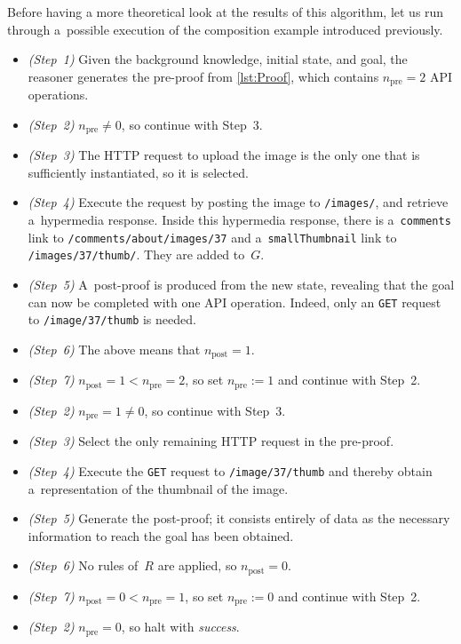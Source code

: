 Before having a more theoretical look at the results of this algorithm,
let us run through a~possible execution
of the composition example introduced previously.

\newcommand\stepref[1]{\emph{(Step~#1)}}
\begin{itemize}
  \item \stepref{1} Given the background knowledge, initial state, and goal,
        the reasoner generates the pre-proof from \cref{lst:Proof},
        which contains $n_{\text{pre}} = 2$ API operations.
  \item \stepref{2} $n_{\text{pre}} \neq 0$, so continue with Step~3.
  \item \stepref{3} The HTTP request to upload the image
        is the only one that is sufficiently instantiated,
        so it is selected.
  \item \stepref{4} Execute the \http request
        by posting the image to \verb!/images/!,
        and retrieve a~hypermedia response.
        Inside this hypermedia response,
        there is a~\verb!comments! link to \verb!/comments/about/images/37!
        and a~\verb!smallThumbnail! link to \verb!/images/37/thumb/!.
        They are added to~$G$.
  \item \stepref{5} A~post-proof is produced from the new state,
        revealing that the goal can now be completed with one API operation.
        Indeed, only an \http \verb!GET! request to \verb!/image/37/thumb! is needed.
  \item \stepref{6} The above means that $n_{\text{post}} = 1$.
  \item \stepref{7} $n_{\text{post}} = 1 < n_{\text{pre}} = 2$,
        so set $n_{\text{pre}} := 1$ and continue with Step~2.
  \item \stepref{2} $n_{\text{pre}} = 1 \neq 0$, so continue with Step~3.
  \item \stepref{3} Select the only remaining HTTP request in the pre-proof.
  \item \stepref{4} Execute the \verb!GET! request to \verb!/image/37/thumb!
        and thereby obtain a~representation of the thumbnail of the image.
  \item \stepref{5} Generate the post-proof;
        it consists entirely of data
        as the necessary information to reach the goal has been obtained.
  \item \stepref{6} No rules of~$R$ are applied, so $n_{\text{post}} = 0$.
  \item \stepref{7} $n_{\text{post}} = 0 < n_{\text{pre}} = 1$,
        so set $n_{\text{pre}} := 0$ and continue with Step~2.
  \item \stepref{2} $n_{\text{pre}} = 0$, so halt with \textit{success}.
\end{itemize}

